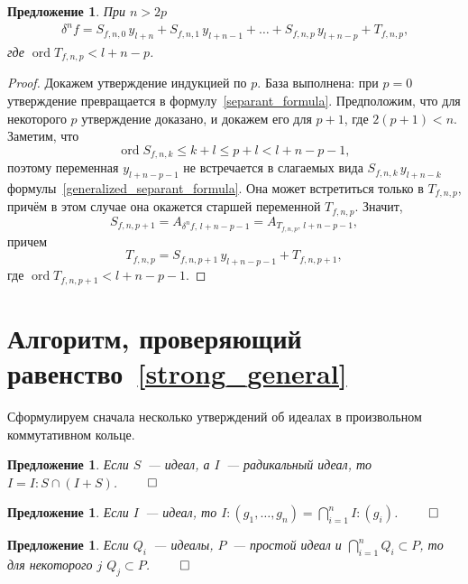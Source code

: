 \documentclass[11pt]{article}
\DeclareMathOperator{\ord}{ord}
\renewcommand{\le}{\leqslant}
\theoremstyle{plain1}
\theoremstyle{plain2}
\theoremstyle{plain}
\theoremstyle{plain3}
\newtheorem{proposition}[theorem1]{Предложение}
\theoremstyle{definition}
\theoremstyle{remark}
\begin{document}
\begin{proposition}
\label{generalized_separants_expansion}
При $n > 2p$
\begin{gather}
\label{generalized_separant_formula}
 \,\delta^n f = S_{f,n,0} \, y_{l+n} + S_{f,n,1} \, y_{l+n-1} + \ldots + S_{f,n,p} \, y_{l+n-p} + T_{f,n,p},
\end{gather}
где $\ord T_{f,n,p} < l+n-p$.
\end{proposition}

\begin{proof}
Докажем утверждение индукцией по $p$.
База выполнена: при $p = 0$ утверждение превращается в формулу~\eqref{separant_formula}.
Предположим, что для некоторого $p$ утверждение доказано, и докажем его для $p + 1$, где $2(p+1) < n$.
Заметим, что 
$$
 \ord S_{f,n,k} \le k + l \le p + l < l+n-p-1,
$$
поэтому переменная $y_{l+n-p-1}$ не встречается в слагаемых вида $S_{f,n,k} \, y_{l+n-k}$ формулы~\eqref{generalized_separant_formula}.
Она может встретиться только в $T_{f,n,p}$, причём в этом случае она окажется старшей переменной $T_{f,n,p}$.
Значит,
$$
 S_{f,n,p+1} = A_{\delta^n f, \, l+n-p-1} = A_{T_{f,n,p}, \, l+n-p-1},
$$
причем 
$$
 T_{f,n,p} = S_{f,n,p+1} \, y_{l+n-p-1} + T_{f,n,p+1},
$$
где $\ord T_{f,n,p+1} < l+n-p-1$.
\end{proof}

\bigskip


\section{Алгоритм, проверяющий равенство~\eqref{strong_general}}
\label{algorithm}

Сформулируем сначала несколько утверждений об идеалах в произвольном коммутативном кольце.

\begin{proposition}
Если $S$~--- идеал, а $I$~--- радикальный идеал, то $I = I:S \cap (I+S)$. $\qed$
\end{proposition}

\begin{proposition}
Если $I$~--- идеал, то $I : (g_1, \ldots, g_n) = \bigcap_{i=1}^n I:(g_i)$. $\qed$
\end{proposition}

\begin{proposition}
\label{Primes}
Если $Q_i$~--- идеалы, $P$~--- простой идеал и $\bigcap_{i=1}^n Q_i \subset P$, то для некоторого $j$ $Q_j \subset P$. $\qed$
\end{proposition}
\end{document}

